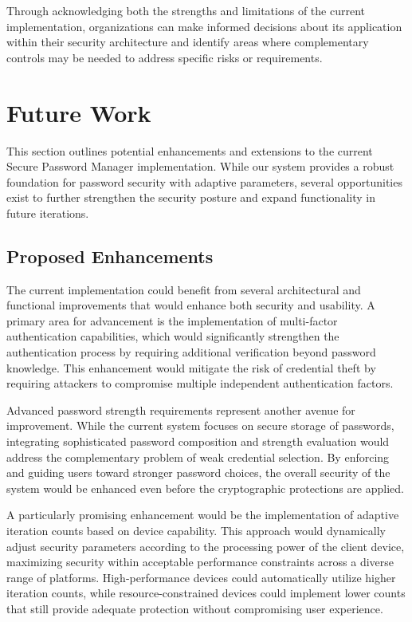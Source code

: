 \documentclass[11pt,a4paper]{article}
\begin{document}
Through acknowledging both the strengths and limitations of the current implementation, organizations can make informed decisions about its application within their security architecture and identify areas where complementary controls may be needed to address specific risks or requirements.

\section{Future Work}
This section outlines potential enhancements and extensions to the current Secure Password Manager implementation. While our system provides a robust foundation for password security with adaptive parameters, several opportunities exist to further strengthen the security posture and expand functionality in future iterations.
\subsection{Proposed Enhancements}
The current implementation could benefit from several architectural and functional improvements that would enhance both security and usability. A primary area for advancement is the implementation of multi-factor authentication capabilities, which would significantly strengthen the authentication process by requiring additional verification beyond password knowledge. This enhancement would mitigate the risk of credential theft by requiring attackers to compromise multiple independent authentication factors.

Advanced password strength requirements represent another avenue for improvement. While the current system focuses on secure storage of passwords, integrating sophisticated password composition and strength evaluation would address the complementary problem of weak credential selection. By enforcing and guiding users toward stronger password choices, the overall security of the system would be enhanced even before the cryptographic protections are applied.

A particularly promising enhancement would be the implementation of adaptive iteration counts based on device capability. This approach would dynamically adjust security parameters according to the processing power of the client device, maximizing security within acceptable performance constraints across a diverse range of platforms. High-performance devices could automatically utilize higher iteration counts, while resource-constrained devices could implement lower counts that still provide adequate protection without compromising user experience.
\end{document}
